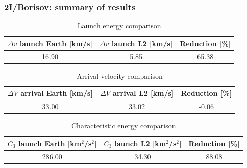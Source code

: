 \documentclass[xcolor={dvipsnames}]{beamer}
\begin{document}
\begin{frame}
\frametitle{2I/Borisov: summary of results}

\begin{table}[H]
  \centering
  \begin{tabular}{|c|c|c|}
    \hline
    $\Delta v$ launch Earth [km/s] & $\Delta v$ launch L2 [km/s] & Reduction [\%] \\
    \hline
    16.90                          & 5.85                        & 65.38          \\
    \hline
  \end{tabular}
  \caption{Launch energy comparison}
  \label{tab:borisov-summary-results-v-launch}
\end{table}

\begin{table}[H]
  \centering
  \begin{tabular}{|c|c|c|}
    \hline
    $\Delta V$ arrival Earth [km/s] & $\Delta V$ arrival L2 [km/s] & Reduction [\%] \\
    \hline
    33.00                           & 33.02                        & -0.06          \\
    \hline
  \end{tabular}
  \caption{Arrival velocity comparison}
  \label{tab:borisov-summary-results-arrival-v}
\end{table}

\begin{table}[H]
  \centering
  \begin{tabular}{|c|c|c|}
    \hline
    $C_3$ launch Earth [km$^2$/s$^2$] & $C_3$ launch L2 [km$^2$/s$^2$] & Reduction [\%] \\
    \hline
    286.00                            & 34.30                          & 88.08          \\
    \hline
  \end{tabular}
  \caption{Characteristic energy comparison}
  \label{tab:borisov-summary-results-c3-launch}
\end{table}

\end{frame}
\end{document}
